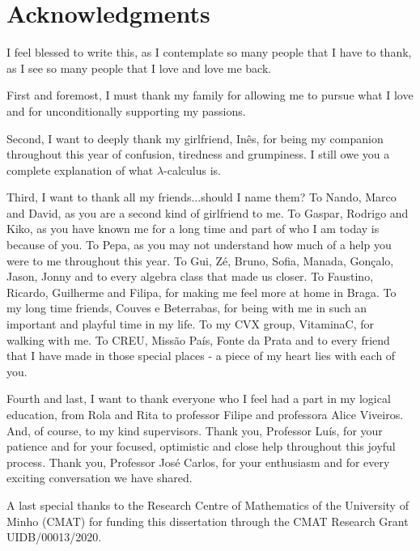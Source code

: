 \chapter*{Acknowledgments}

I feel blessed to write this, as I contemplate so many people that I have to thank, as I see so many people that I love and love me back.

First and foremost, I must thank my family for allowing me to pursue what I love and for unconditionally supporting my passions.

Second, I want to deeply thank my girlfriend, Inês, for being my companion throughout this year of confusion, tiredness and grumpiness.
I still owe you a complete explanation of what $\lambda$-calculus is.

Third, I want to thank all my friends...should I name them?
To Nando, Marco and David, as you are a second kind of girlfriend to me.
To Gaspar, Rodrigo and Kiko, as you have known me for a long time and part of who I am today is because of you.
To Pepa, as you may not understand how much of a help you were to me throughout this year.
To Gui, Zé, Bruno, Sofia, Manada, Gonçalo, Jason, Jonny and to every algebra class that made us closer.
To Faustino, Ricardo, Guilherme and Filipa, for making me feel more at home in Braga.
To my long time friends, Couves e Beterrabas, for being with me in such an important and playful time in my life.
To my CVX group, VitaminaC, for walking with me.
To CREU, Missão País, Fonte da Prata and to every friend that I have made in those special places - a piece of my heart lies with each of you.

Fourth and last, I want to thank everyone who I feel had a part in my logical education, from Rola and Rita to professor Filipe and professora Alice Viveiros.
And, of course, to my kind supervisors.
Thank you, Professor Luís, for your patience and for your focused, optimistic and close help throughout this joyful process.
Thank you, Professor José Carlos, for your enthusiasm and for every exciting conversation we have shared.

A last special thanks to  the Research Centre of Mathematics of the University of Minho (CMAT) for funding this dissertation through the CMAT Research Grant UIDB/00013/2020.


